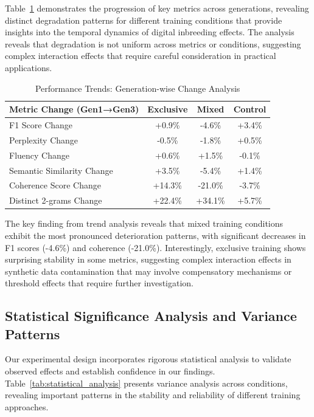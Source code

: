 \documentclass{article}
\begin{document}
Table~\ref{tab:trend_analysis} demonstrates the progression of key metrics across generations, revealing distinct degradation patterns for different training conditions that provide insights into the temporal dynamics of digital inbreeding effects. The analysis reveals that degradation is not uniform across metrics or conditions, suggesting complex interaction effects that require careful consideration in practical applications.

\begin{table}[h]
\centering
\caption{Performance Trends: Generation-wise Change Analysis}
\label{tab:trend_analysis}
\begin{tabular}{lccc}
\toprule
\textbf{Metric Change (Gen1→Gen3)} & \textbf{Exclusive} & \textbf{Mixed} & \textbf{Control} \\
\midrule
F1 Score Change & +0.9\% & -4.6\% & +3.4\% \\
Perplexity Change & -0.5\% & -1.8\% & +0.5\% \\
Fluency Change & +0.6\% & +1.5\% & -0.1\% \\
Semantic Similarity Change & +3.5\% & -5.4\% & +1.4\% \\
Coherence Score Change & +14.3\% & -21.0\% & -3.7\% \\
Distinct 2-grams Change & +22.4\% & +34.1\% & +5.7\% \\
\bottomrule
\end{tabular}
\end{table}

The key finding from trend analysis reveals that mixed training conditions exhibit the most pronounced deterioration patterns, with significant decreases in F1 scores (-4.6\%) and coherence (-21.0\%). Interestingly, exclusive training shows surprising stability in some metrics, suggesting complex interaction effects in synthetic data contamination that may involve compensatory mechanisms or threshold effects that require further investigation.

\subsection{Statistical Significance Analysis and Variance Patterns}

Our experimental design incorporates rigorous statistical analysis to validate observed effects and establish confidence in our findings. Table~\ref{tab:statistical_analysis} presents variance analysis across conditions, revealing important patterns in the stability and reliability of different training approaches.
\end{document}
